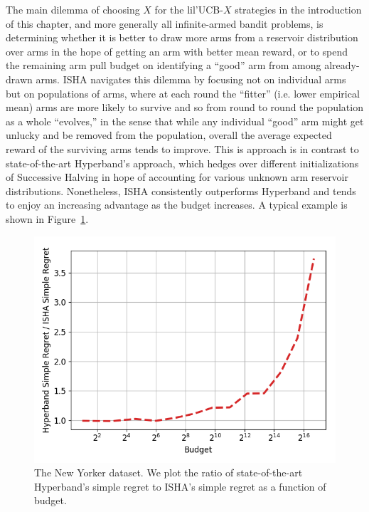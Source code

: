 The main dilemma of choosing $X$ for the lil'UCB-$X$ strategies in the introduction of this chapter, and more generally all infinite-armed bandit problems, is determining whether it is better to draw more arms from a reservoir distribution over arms in the hope of getting an arm with better mean reward, or to spend the remaining arm pull budget on identifying a ``good'' arm from among already-drawn arms.
ISHA navigates this dilemma by focusing not on individual arms but on populations of arms, where at each round the ``fitter'' (i.e. lower empirical mean) arms are more likely to survive and so from round to round the population as a whole ``evolves,'' in the sense that while any individual ``good'' arm might get unlucky and be removed from the population, overall the average expected reward of the surviving arms tends to improve. This is approach is in contrast to state-of-the-art Hyperband's approach, which hedges over different initializations of Successive Halving in hope of accounting for various unknown arm reservoir distributions. Nonetheless, ISHA consistently outperforms Hyperband and tends to enjoy
an increasing advantage as the budget increases.
A typical example is shown in Figure~\ref{fig:isha_vs_hb_improvement}.

\begin{figure}
 \vspace{-2.5em}
\includegraphics[width=.45\textwidth]{fixedbudget/figures/NY.png}
\caption{The New Yorker dataset. We plot the ratio of state-of-the-art 
Hyperband's simple regret to ISHA's simple regret as a function of
budget. }
\label{fig:isha_vs_hb_improvement}
\vspace{-1.5em}
\end{figure}





